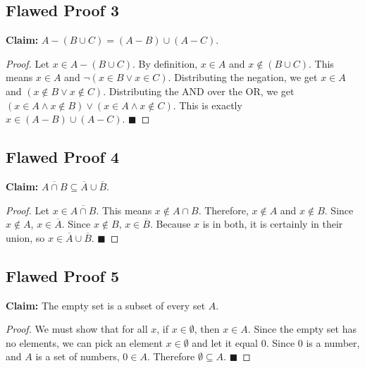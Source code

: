 \documentclass[11pt, a4paper]{article}
\theoremstyle{definition}
\theoremstyle{remark}
\begin{document}
\subsection{Flawed Proof 3}
\textbf{Claim:} $A - (B \cup C) = (A - B) \cup (A - C)$.
\begin{proof}
Let $x \in A - (B \cup C)$.
By definition, $x \in A$ and $x \notin (B \cup C)$.
This means $x \in A$ and $\neg(x \in B \lor x \in C)$.
Distributing the negation, we get $x \in A$ and $(x \notin B \lor x \notin C)$.
Distributing the AND over the OR, we get $(x \in A \land x \notin B) \lor (x \in A \land x \notin C)$.
This is exactly $x \in (A - B) \cup (A - C)$. $\blacksquare$
\end{proof}

\subsection{Flawed Proof 4}
\textbf{Claim:} $\overline{A \cap B} \subseteq \overline{A} \cup \overline{B}$.
\begin{proof}
Let $x \in \overline{A \cap B}$.
This means $x \notin A \cap B$.
Therefore, $x \notin A$ and $x \notin B$.
Since $x \notin A$, $x \in \overline{A}$. Since $x \notin B$, $x \in \overline{B}$.
Because $x$ is in both, it is certainly in their union, so $x \in \overline{A} \cup \overline{B}$. $\blacksquare$
\end{proof}

\subsection{Flawed Proof 5}
\textbf{Claim:} The empty set is a subset of every set $A$.
\begin{proof}
We must show that for all $x$, if $x \in \emptyset$, then $x \in A$.
Since the empty set has no elements, we can pick an element $x \in \emptyset$ and let it equal $0$.
Since $0$ is a number, and $A$ is a set of numbers, $0 \in A$.
Therefore $\emptyset \subseteq A$. $\blacksquare$
\end{proof}

\hrulefill
\end{document}
